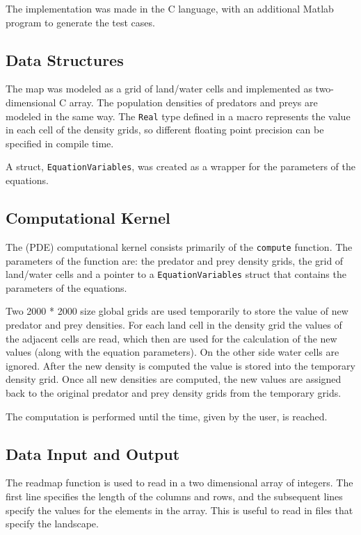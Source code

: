 \documentclass[12pt,a4paper]{article}
\begin{document}
The implementation was made in the C language, with an additional Matlab program to generate the test cases. 

\subsection{Data Structures}

The map was modeled as a grid of land/water cells and implemented as two-dimensional C array. The population densities of predators and preys are modeled in the same way. The \texttt{Real} type defined in a macro represents the value in each cell of the density grids, so different floating point precision can be specified in compile time. 

A struct, \texttt{EquationVariables}, was created as a wrapper for the parameters of the equations.

\subsection{Computational Kernel}

The (PDE) computational kernel consists primarily of the \texttt{compute} function. The parameters of the function are: the predator and prey density grids, the grid of land/water cells and a pointer to a \texttt{EquationVariables} struct that contains the parameters of the equations. 

Two 2000 * 2000 size global grids are used temporarily to store the value of new predator and prey densities. For each land cell in the density grid the values of the adjacent cells are read, which then are used for the calculation of the new values (along with the equation parameters). On the other side water cells are ignored. After the new density is computed the value is stored into the temporary density grid. Once all new densities are computed, the new values are assigned back to the original predator and prey density grids from the temporary grids.

The computation is performed until the time, given by the user, is reached.


\subsection{Data Input and Output}

The readmap function is used to read in a two dimensional array of integers. The first line specifies the length of the columns and rows, and the subsequent lines specify the values for the elements in the array. This is useful to read in files that specify the landscape.
\end{document}
